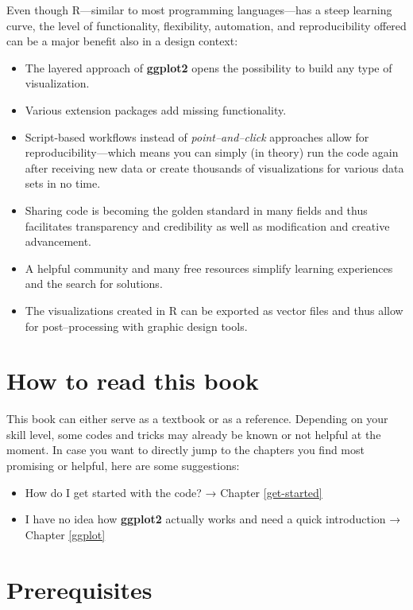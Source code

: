 \documentclass[
]{krantz}
\providecommand{\tightlist}{%
  \setlength{\itemsep}{0pt}\setlength{\parskip}{0pt}}
\begin{document}
Even though R---similar to most programming languages---has a steep learning curve, the level of functionality, flexibility, automation, and reproducibility offered can be a major benefit also in a design context:

\begin{itemize}
\tightlist
\item
  The layered approach of \textbf{ggplot2} opens the possibility to build any type of visualization.
\item
  Various extension packages add missing functionality.
\item
  Script-based workflows instead of \emph{point--and--click} approaches allow for reproducibility---which means you can simply (in theory) run the code again after receiving new data or create thousands of visualizations for various data sets in no time.
\item
  Sharing code is becoming the golden standard in many fields and thus facilitates transparency and credibility as well as modification and creative advancement.
\item
  A helpful community and many free resources simplify learning experiences and the search for solutions.
\item
  The visualizations created in R can be exported as vector files and thus allow for post--processing with graphic design tools.
\end{itemize}

\hypertarget{how-to-read-this-book}{%
\section*{How to read this book}\label{how-to-read-this-book}}


This book can either serve as a textbook or as a reference. Depending on your skill level, some codes and tricks may already be known or not helpful at the moment. In case you want to directly jump to the chapters you find most promising or helpful, here are some suggestions:

\begin{itemize}
\tightlist
\item
  How do I get started with the code? → Chapter \ref{get-started}
\item
  I have no idea how \textbf{ggplot2} actually works and need a quick introduction → Chapter \ref{ggplot}
\end{itemize}

\hypertarget{prerequisites}{%
\section*{Prerequisites}\label{prerequisites}}
\end{document}
